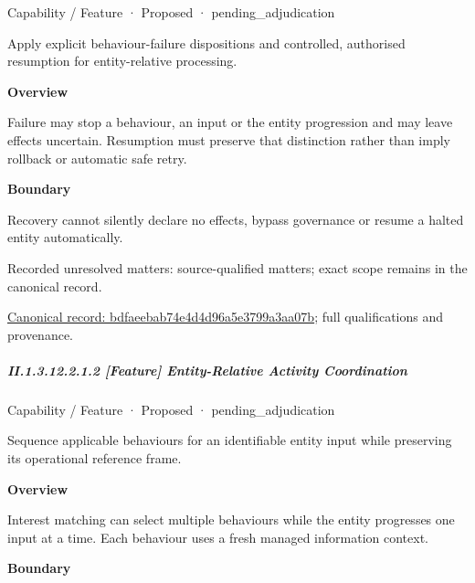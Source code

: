 \label{element:bdfaeebab74e4d4d96a5e3799a3aa07b}
{\small Capability / Feature · Proposed · pending\_adjudication}\par

Apply explicit behaviour-failure dispositions and controlled, authorised resumption for entity-relative processing.



\textbf{Overview}



Failure may stop a behaviour, an input or the entity progression and may leave effects uncertain. Resumption must preserve that distinction rather than imply rollback or automatic safe retry.



\textbf{Boundary}



Recovery cannot silently declare no effects, bypass governance or resume a halted entity automatically.


{\small Recorded unresolved matters: source-qualified matters; exact scope remains in the canonical record.}\par
{\footnotesize \href{../../../../continuum/strategy/capability/feature/bdfaeebab74e4d4d96a5e3799a3aa07b.md}{Canonical record: bdfaeebab74e4d4d96a5e3799a3aa07b}; full qualifications and provenance.}\par
\subparagraph*{II.1.3.12.2.1.2 [Feature] Entity-Relative Activity Coordination}
\label{navigation:II.1.3.12.2.1.2}

\label{element:b9960d7de097464ea6de94929ca48c89}
{\small Capability / Feature · Proposed · pending\_adjudication}\par

Sequence applicable behaviours for an identifiable entity input while preserving its operational reference frame.



\textbf{Overview}



Interest matching can select multiple behaviours while the entity progresses one input at a time. Each behaviour uses a fresh managed information context.



\textbf{Boundary}



